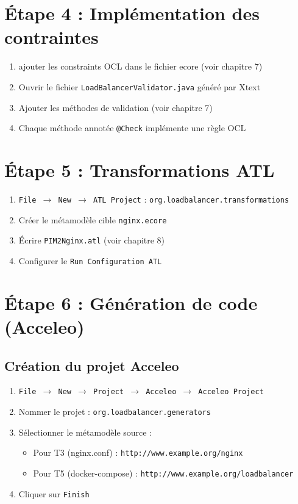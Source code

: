 \documentclass[12pt,a4paper]{report}
\begin{document}
\section{Étape 4 : Implémentation des contraintes}

\begin{enumerate}
  \item ajouter les constraints OCL dans le fichier ecore (voir chapitre 7)
  \item Ouvrir le fichier \texttt{LoadBalancerValidator.java} généré par Xtext
  \item Ajouter les méthodes de validation (voir chapitre 7)
  \item Chaque méthode annotée \texttt{@Check} implémente une règle OCL
\end{enumerate}

\section{Étape 5 : Transformations ATL}

\begin{enumerate}
  \item \texttt{File $\rightarrow$ New $\rightarrow$ ATL Project} : \texttt{org.loadbalancer.transformations}
  \item Créer le métamodèle cible \texttt{nginx.ecore}
  \item Écrire \texttt{PIM2Nginx.atl} (voir chapitre 8)
  \item Configurer le \texttt{Run Configuration ATL}
\end{enumerate}

\section{Étape 6 : Génération de code (Acceleo)}

\subsection{Création du projet Acceleo}

\begin{enumerate}
  \item \texttt{File $\rightarrow$ New $\rightarrow$ Project $\rightarrow$ Acceleo $\rightarrow$ Acceleo Project}
  \item Nommer le projet : \texttt{org.loadbalancer.generators}
  \item Sélectionner le métamodèle source :
    \begin{itemize}
      \item Pour T3 (nginx.conf) : \texttt{http://www.example.org/nginx}
      \item Pour T5 (docker-compose) : \texttt{http://www.example.org/loadbalancer}
    \end{itemize}
  \item Cliquer sur \texttt{Finish}
\end{enumerate}
\end{document}

